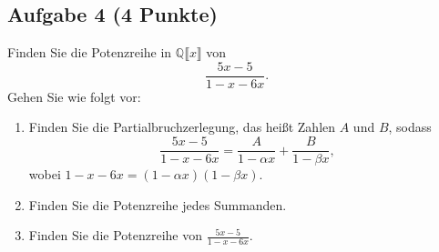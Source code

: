 \documentclass{article} %
\begin{document}
\subsection*{Aufgabe 4 (4 Punkte)}  
Finden Sie die Potenzreihe in $\mathbb{Q} \llbracket x \rrbracket$ von
\[
\frac{5x - 5}{1 - x - 6x}.
\]
Gehen Sie wie folgt vor:
\begin{enumerate}
    \item Finden Sie die Partialbruchzerlegung, das heißt Zahlen $A$ und $B$, sodass
    \[
    \frac{5x - 5}{1 - x - 6x} = \frac{A}{1 - \alpha x} + \frac{B}{1 - \beta x},
    \]
    wobei $1 - x - 6x = (1 - \alpha x)(1 - \beta x)$.
    \item Finden Sie die Potenzreihe jedes Summanden.
    \item Finden Sie die Potenzreihe von $\frac{5x - 5}{1 - x - 6x}$.
\end{enumerate}
\end{document}
